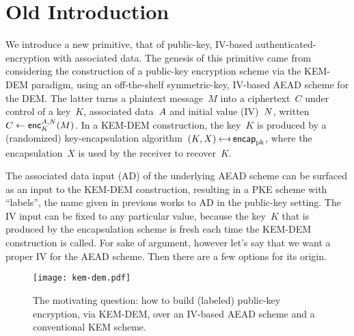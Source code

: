 \section{Old Introduction}
\label{sec:intro}
We introduce a new primitive, that of public-key, IV-based authenticated-encryption with associated data. The genesis of this primitive came from considering the construction of a public-key encryption scheme via the KEM-DEM paradigm, using an off-the-shelf symmetric-key, IV-based AEAD scheme for the DEM.  The latter turns a plaintext message~$M$ into a ciphertext~$C$ under control of a key~$K$, associated data~$A$ and initial value (IV)~$N$, written $C \gets {\mathsf{enc}}_{K}^{A,N}(M)$.  In a KEM-DEM construction, the key~$K$ is produced by a (randomized) key-encapsulation algorithm~$(K,X)\getsr\encap_\pk$, where the encapsulation~$X$ is used by the receiver to recover~$K$.  

The associated data input (AD) of the underlying AEAD scheme can be surfaced as an input to the KEM-DEM construction, resulting in a PKE scheme with ``labels'', the name given in previous works to AD in the public-key setting.  The IV input can be fixed to any particular value, because the key~$K$ that is produced by the encapsulation scheme is fresh each time the KEM-DEM construction is called.  For sake of argument, however let's say that we want a proper IV for the AEAD scheme.    Then there are a few options for its origin.

\begin{figure}[h]
\begin{center}
\texttt{[image: kem-dem.pdf]}
\caption{The motivating question: how to build (labeled) public-key encryption, via KEM-DEM, over an IV-based AEAD scheme and a conventional KEM scheme.}
\label{fig:kem-example}
\end{center}
\end{figure}

